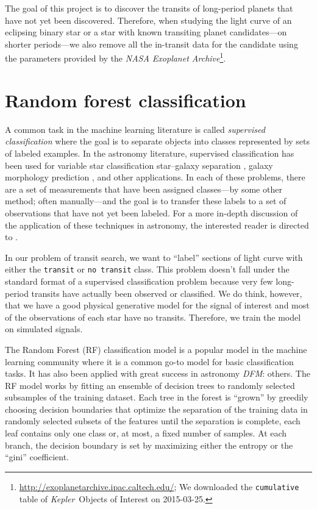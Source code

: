 \documentclass[12pt,preprint]{aastex}
\newcommand{\project}[1]{\textsl{#1}}
\newcommand{\kepler}{\project{Kepler}}
\newcommand{\sectlabel}[1]{\label{sect:#1}}
\newcommand{\todo}[3]{{\color{#2}\emph{#1}: #3}}
\newcommand{\dfmtodo}[1]{\todo{DFM}{red}{#1}}
\begin{document}
The goal of this project is to discover the transits of long-period planets
that have not yet been discovered.
Therefore, when studying the light curve of an eclipsing binary star or a star
with known transiting planet candidates---on shorter periods---we also remove
all the in-transit data for the candidate using the parameters provided by the
\project{NASA Exoplanet
Archive}\footnote{\url{http://exoplanetarchive.ipac.caltech.edu/}; We
downloaded the \texttt{cumulative} table of \kepler\ Objects of Interest on
2015-03-25.}.



\section{Random forest classification}\sectlabel{rfc}

A common task in the machine learning literature is called \emph{supervised
classification} where the goal is to separate objects into classes
represented by sets of labeled examples.
In the astronomy literature, supervised classification has been used for
variable star classification \citep{Richards:2011} star--galaxy separation
\citep{Fadely:2012}, galaxy morphology prediction \citep{Dieleman:2015}, and
other applications.
In each of these problems, there are a set of measurements that have been
assigned classes---by some other method; often manually---and the goal is to
transfer these labels to a set of observations that have not yet been
labeled.
For a more in-depth discussion of the application of these techniques in
astronomy, the interested reader is directed to \citet{Ivezic:2013}.

In our problem of transit search, we want to ``label'' sections of light curve
with either the \texttt{transit} or \texttt{no transit} class.
This problem doesn't fall under the standard format of a supervised
classification problem because very few long-period transits have actually
been observed or classified.
We do think, however, that we have a good physical generative model for the
signal of interest and most of the observations of each star have no transits.
Therefore, we train the model on simulated signals.

The Random Forest (RF) classification model \citep{Breiman:2001} is a popular
model in the machine learning community where it is a common go-to model for
basic classification tasks.
It has also been applied with great success in astronomy \citep[for
example]{Richards:2011, Richards:2012} \dfmtodo{others}.
The RF model works by fitting an ensemble of decision trees to randomly
selected subsamples of the training dataset.
Each tree in the forest is ``grown'' by greedily choosing decision boundaries
that optimize the separation of the training data in randomly selected
subsets of the features until the separation is complete, each leaf contains
only one class or, at most, a fixed number of samples.
At each branch, the decision boundary is set by maximizing either the entropy
or the ``gini'' coefficient.
\end{document}
